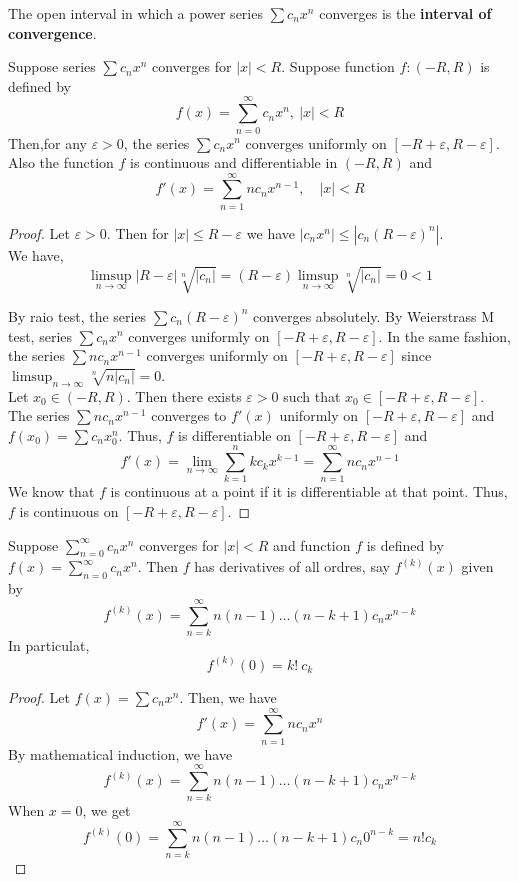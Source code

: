 \begin{remark}
	The open interval in which a power series $\sum c_n x^n$ converges is the \textbf{interval of convergence}.
\end{remark}

\begin{theorem}
	Suppose series $\sum c_n x^n$ converges for $|x| < R$.
	Suppose function $f : (-R,R)$ is defined by \[ f(x) = \sum_{n = 0}^\infty c_n x^n,\ |x| < R \]
	Then,for any $\varepsilon > 0$, the series $\sum c_n x^n$ converges uniformly on $[-R+\varepsilon,R-\varepsilon]$.
	Also the function $f$ is continuous and differentiable in $(-R,R)$ and
	\[ f'(x) = \sum_{n = 1}^\infty nc_n x^{n-1},\quad |x| < R \]
\end{theorem}
\begin{proof}
	Let $\varepsilon > 0$.
	Then for $|x| \le R - \varepsilon$ we have $|c_n x^n| \le |c_n (R-\varepsilon)^n|$.\\

	We have, 
	\[ \limsup_{n \to \infty} |R-\varepsilon| \sqrt[n]{|c_n|} = (R-\varepsilon) \limsup_{n \to\infty} \sqrt[n]{|c_n|} = 0 < 1 \]

	By raio test, the series $\sum c_n (R-\varepsilon)^n$ converges absolutely.
	By Weierstrass M test, series $\sum c_n x^n$ converges uniformly on $[-R+\varepsilon,R-\varepsilon]$.
	In the same fashion, the series $\sum nc_n x^{n-1}$ converges uniformly on $[-R+\varepsilon,R-\varepsilon]$ since $\displaystyle \limsup_{n \to \infty} \sqrt[n]{n|c_n|} = 0$.\\

	Let $x_0 \in (-R,R)$.
	Then there exists $\varepsilon > 0$ such that $x_0 \in [-R+\varepsilon, R-\varepsilon]$.
	The series $\sum n c_n x^{n-1}$ converges to $f'(x)$ uniformly on $[-R+\varepsilon,R-\varepsilon]$ and $f(x_0) = \sum c_n x_0^n$.
	Thus, $f$ is differentiable on $[-R+\varepsilon,R-\varepsilon]$ and
	\[ f'(x) = \lim_{n \to \infty} \sum_{k=1}^n k c_k x^{k-1} = \sum_{n = 1}^\infty n c_n x^{n-1} \]
	We know that $f$ is continuous at a point if it is differentiable at that point.
	Thus, $f$ is continuous on $[-R+\varepsilon,R-\varepsilon]$.
\end{proof}

\begin{corollary}
	Suppose $\displaystyle \sum_{n = 0}^\infty c_n x^n$ converges for $|x| < R$ and function $f$ is defined by $f(x) = \displaystyle \sum_{n = 0}^\infty c_n x^n$.
	Then $f$ has derivatives of all ordres, say $f^{(k)}(x)$ given by
	\[ f^{(k)}(x) = \sum_{n=k}^\infty n(n-1)\dots(n-k+1)c_n x^{n-k} \]
	In particulat,
	\[ f^{(k)}(0) = k!\ c_k \]
\end{corollary}
\begin{proof}
	Let $f(x) = \sum c_n x^n$.
	Then, we have 
	\[ f'(x) = \sum_{n = 1}^\infty n c_n x^n \]
	By mathematical induction, we have
	\[ f^{(k)}(x) = \sum_{n = k}^\infty n(n-1)\dots(n-k+1) c_n x^{n-k} \]
	When $x = 0$, we get
	\[ f^{(k)}(0) = \sum_{n = k}^\infty n(n-1)\dots(n-k+1) c_n 0^{n-k} = n! c_k \]
\end{proof}

